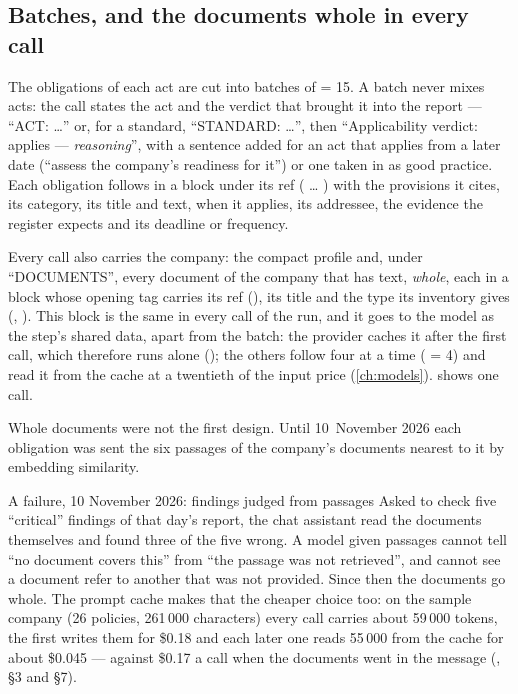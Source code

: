 \subsection{Batches, and the documents whole in every call}

The obligations of each act are cut into batches of  = 15. A batch
never mixes acts: the call states the act and the verdict that brought it into the report ---
\enquote{ACT: \ldots} or, for a standard, \enquote{STANDARD: \ldots}, then \enquote{Applicability
verdict: applies --- \emph{reasoning}}, with a sentence added for an act that applies from a later
date (\enquote{assess the company's readiness for it}) or one taken in as good practice. Each
obligation follows in a block under its ref ( \ldots{} ) with the provisions
it cites, its category, its title and text, when it applies, its addressee, the evidence the
register expects and its deadline or frequency.

Every call also carries the company: the compact profile and, under \enquote{DOCUMENTS}, every
document of the company that has text, \emph{whole}, each in a  block whose
opening tag carries its ref (), its title and the type its inventory gives
(, ). This block is the same in every call of the run, and it goes to the
model as the step's shared data, apart from the batch: the provider caches it after the first
call, which therefore runs alone (); the others follow four at a time
( = 4) and read it from the cache at a twentieth of the input price
(\cref{ch:models}).  shows one call.

Whole documents were not the first design. Until 10~November 2026 each obligation was sent the
six passages of the company's documents nearest to it by embedding similarity.

\begin{lessonbox}{A failure, 10 November 2026: findings judged from passages}
Asked to check five \enquote{critical} findings of that day's report, the chat assistant read
the documents themselves and found three of the five wrong. A model given
passages cannot tell \enquote{no document covers this} from \enquote{the passage was not
retrieved}, and cannot see a document refer to another that was not provided. Since then the
documents go whole. The prompt cache makes that the cheaper choice too: on the sample company
(26 policies, 261\,000 characters) every call carries about 59\,000 tokens, the first writes
them for \$0.18 and each later one reads 55\,000 from the cache for about \$0.045 --- against
\$0.17 a call when the documents went in the message (, §3 and §7).
\end{lessonbox}

